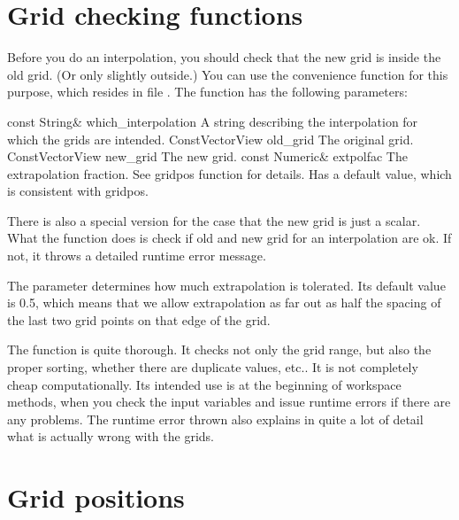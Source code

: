 \section{Grid checking functions}
\label{sec:interpolation:gridchecking}

Before you do an interpolation, you should check that the new grid is
inside the old grid. (Or only slightly outside.) You can use the
convenience function  for this
purpose, which resides in file . The
function has the following parameters:

\begin{code}
const String&     which_interpolation   A string describing the 
                                        interpolation for which 
                                        the grids are intended. 
ConstVectorView   old_grid              The original grid.
ConstVectorView   new_grid              The new grid.
const Numeric&    extpolfac             The extrapolation fraction. 
                                        See gridpos function for 
                                        details. Has a default 
                                        value, which is consistent 
                                        with gridpos.  
\end{code}

There is also a special version for the case that the new grid is just
a scalar. What the function does is check if old and new grid for an
interpolation are ok. If not, it throws a detailed runtime error
message. 

The parameter  determines how much extrapolation
is tolerated. Its default value is 0.5, which means that we allow
extrapolation as far out as half the spacing of the last two grid
points on that edge of the grid.

The  function is quite thorough.
It checks not only the grid range, but also the proper sorting,
whether there are duplicate values, etc.. It is not completely cheap
computationally. Its intended use is at the beginning of workspace
methods, when you check the input variables and issue runtime errors
if there are any problems. The runtime error thrown also explains in
quite a lot of detail what is actually wrong with the grids.
  

\section{Grid positions}
\label{sec:interpolation:gridpos}

